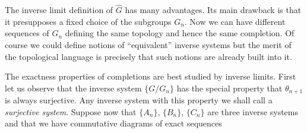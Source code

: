 The inverse limit definition of $\widehat G$ has many advantages. Its main drawback is that it presupposes a fixed choice of the subgroups $G_n$. Now we can have different sequences of $G_n$ defining the same topology and hence the same completion. Of course we could define notions of ``equivalent'' inverse systems but the merit of the topological language is precisely that such notions are already built into it.

The exactness properties of completions are best studied by inverse limits. First let us observe that the inverse system $\{G/G_n\}$ has the special property that $\theta_{n+1}$ is always surjective. Any inverse system with this property we shall call a \textit{surjective system}. Suppose now that $\{A_n\}$, $\{B_n\}$, $\{C_n\}$ are three inverse systems and that we have commutative diagrams of exact sequences

\begin{center}

\end{center}
